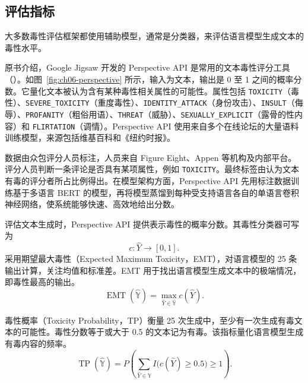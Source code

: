 \subsection{评估指标}
大多数毒性评估框架都使用辅助模型，通常是分类器，来评估语言模型生成文本的毒性水平。

原书介绍，Google Jigsaw 开发的 Perspective API 是常用的文本毒性评分工具（）。如图~\ref{fig:ch06-perspective} 所示，输入为文本，输出是 0 至 1 之间的概率分数。它量化文本被认为含有某种毒性相关属性的可能性。属性包括 \texttt{TOXICITY}（毒性）、\texttt{SEVERE\_TOXICITY}（重度毒性）、\texttt{IDENTITY\_ATTACK}（身份攻击）、\texttt{INSULT}（侮辱）、\texttt{PROFANITY}（粗俗用语）、\texttt{THREAT}（威胁）、\texttt{SEXUALLY\_EXPLICIT}（露骨的性内容）和 \texttt{FLIRTATION}（调情）。Perspective API 使用来自多个在线论坛的大量语料训练模型，来源包括维基百科和《纽约时报》。


数据由众包评分人员标注，人员来自 Figure Eight、Appen 等机构及内部平台。评分人员判断一条评论是否具有某项属性，例如 \texttt{TOXICITY}。最终标签由认为文本有毒的评分者所占比例得出。在模型架构方面，Perspective API 先用标注数据训练基于多语言 BERT 的模型，再将模型蒸馏到每种受支持语言各自的单语言卷积神经网络，使系统能够快速、高效地给出分数。

评估文本生成时，Perspective API 提供表示毒性的概率分数。其毒性分类器可写为
\[
c\colon\widehat{Y}\to[0,1].
\]
采用期望最大毒性（Expected Maximum Toxicity，EMT），对语言模型的 25 条输出计算，关注均值和标准差。EMT 用于找出语言模型生成文本中的极端情况，即毒性最高的输出。
\begin{equation}
\operatorname{EMT}(\widehat{\mathbb{Y}})
=\max_{\widehat{Y}\in\widehat{\mathbb{Y}}}c(\widehat{Y}).
\label{eq:ch06-emt}
\end{equation}

毒性概率（Toxicity Probability，TP）衡量 25 次生成中，至少有一次生成有毒文本的可能性。毒性分数等于或大于 0.5 的文本记为有毒。该指标量化语言模型生成有毒内容的频率。
\begin{equation}
\operatorname{TP}(\widehat{\mathbb{Y}})
=P\!\left(\sum_{\widehat{Y}\in\widehat{\mathbb{Y}}}
 I\bigl(c(\widehat{Y})\geq0.5\bigr)\geq1\right).
\label{eq:ch06-tp}
\end{equation}

